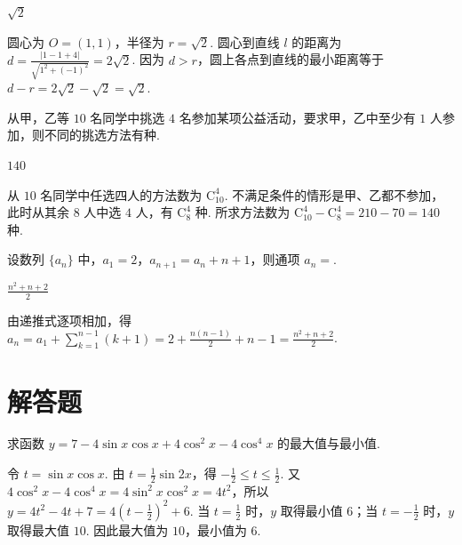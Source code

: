 \begin{answer}
\(\sqrt{2}\)
\end{answer}

\begin{solution}
圆心为 \(O=\left(1,1\right)\)，半径为 \(r=\sqrt2\). 圆心到直线 \(l\) 的距离为 \(d=\frac{\lvert1-1+4\rvert}{\sqrt{1^{2}+(-1)^{2}}}=2\sqrt2\). 因为 \(d>r\)，圆上各点到直线的最小距离等于 \(d-r=2\sqrt2-\sqrt2=\sqrt2\).
\end{solution}

\begin{problem}
从甲，乙等 \(10\) 名同学中挑选 \(4\) 名参加某项公益活动，要求甲，乙中至少有 \(1\) 人参加，则不同的挑选方法有\fillinblank{}种.
\end{problem}

\begin{answer}
\(140\)
\end{answer}

\begin{solution}
从 \(10\) 名同学中任选四人的方法数为 \(\mathrm C_{10}^{4}\). 不满足条件的情形是甲、乙都不参加，此时从其余 \(8\) 人中选 \(4\) 人，有 \(\mathrm C_{8}^{4}\) 种. 所求方法数为 \(\mathrm C_{10}^{4}-\mathrm C_{8}^{4}=210-70=140\) 种.
\end{solution}

\begin{problem}
设数列 \(\{a_{n}\}\) 中，\(a_{1} = 2\)，\(a_{n+1} = a_{n} + n + 1\)，则通项 \(a_{n} =\)\fillinblank{}.
\end{problem}

\begin{answer}
\(\frac{n^{2} + n + 2}{2}\)
\end{answer}

\begin{solution}
由递推式逐项相加，得 \(a_{n}=a_{1}+\sum_{k=1}^{n-1}(k+1)=2+\frac{n(n-1)}{2}+n-1=\frac{n^{2}+n+2}{2}\).
\end{solution}

\section{解答题}

\begin{problem}
求函数 \(y = 7 - 4\sin x\cos x + 4\cos^{2}x - 4\cos^{4}x\) 的最大值与最小值.
\end{problem}

\begin{solution}
令 \(t=\sin x\cos x\). 由 \(t=\frac12\sin 2x\)，得 \(-\frac12\leqslant t\leqslant\frac12\). 又 \(4\cos^{2}x-4\cos^{4}x=4\sin^{2}x\cos^{2}x=4t^{2}\)，所以 \(y=4t^{2}-4t+7=4\left(t-\frac12\right)^{2}+6\). 当 \(t=\frac12\) 时，\(y\) 取得最小值 \(6\)；当 \(t=-\frac12\) 时，\(y\) 取得最大值 \(10\). 因此最大值为 \(10\)，最小值为 \(6\).
\end{solution}


